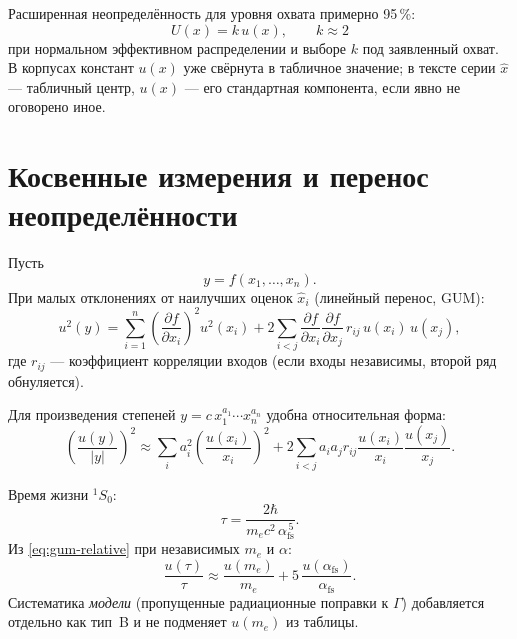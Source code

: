 Расширенная неопределённость для уровня охвата примерно 95\,\%:
\begin{equation}
\label{eq:expanded-uncertainty}
  U(x) = k\,u(x),\qquad k\approx 2
\end{equation}
при нормальном эффективном распределении и выборе $k$ под заявленный охват.
В корпусах констант $u(x)$ уже свёрнута в табличное значение; в тексте серии
$\hat x$ --- табличный центр, $u(x)$ --- его стандартная компонента, если явно не оговорено иное.

\section{Косвенные измерения и перенос неопределённости}
\label{sec:indirect-gum}

Пусть
\begin{equation}
  y = f(x_1,\ldots,x_n).
\end{equation}
При малых отклонениях от наилучших оценок $\hat x_i$ (линейный перенос, GUM):
\begin{equation}
\label{eq:gum-linear}
  u^2(y) = \sum_{i=1}^{n}\left(\frac{\partial f}{\partial x_i}\right)^{\!2} u^2(x_i)
  + 2\sum_{i<j}\frac{\partial f}{\partial x_i}\frac{\partial f}{\partial x_j}\,r_{ij}\,u(x_i)\,u(x_j),
\end{equation}
где $r_{ij}$ --- коэффициент корреляции входов (если входы независимы, второй ряд обнуляется).

Для произведения степеней $y = c\,x_1^{a_1}\cdots x_n^{a_n}$ удобна относительная форма:
\begin{equation}
\label{eq:gum-relative}
  \left(\frac{u(y)}{|y|}\right)^{\!2}
  \approx \sum_i a_i^2\left(\frac{u(x_i)}{x_i}\right)^{\!2}
  + 2\sum_{i<j} a_i a_j r_{ij}\frac{u(x_i)}{x_i}\frac{u(x_j)}{x_j}.
\end{equation}

\begin{remark}
\label{ex:para-ps-tau}
Время жизни $^1S_0$:
\begin{equation}
\label{eq:para-ps-tau}
  \tau = \frac{2\hbar}{m_e c^2\,\alpha_{\mathrm{fs}}^{\,5}}.
\end{equation}
Из \eqref{eq:gum-relative} при независимых $m_e$ и $\alpha$:
\begin{equation}
\label{eq:tau-relative-unc}
  \frac{u(\tau)}{\tau}
  \approx \frac{u(m_e)}{m_e} + 5\,\frac{u(\alpha_{\mathrm{fs}})}{\alpha_{\mathrm{fs}}}.
\end{equation}
Систематика \emph{модели} (пропущенные радиационные поправки к $\Gamma$)
добавляется отдельно как тип~B и не подменяет $u(m_e)$ из таблицы.
\end{remark}

